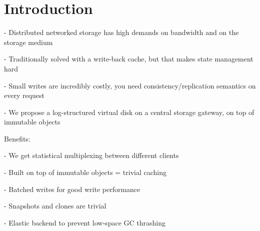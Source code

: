 \section{Introduction}

- Distributed networked storage has high demands on bandwidth and on the storage medium

- Traditionally solved with a write-back cache, but that makes state management hard

- Small writes are incredibly costly, you need consistency/replication semantics on every request

- We propose a log-structured virtual disk on a central storage gateway, on top
  of immutable objects

Benefits:

- We get statistical multiplexing between different clients

- Built on top of immutable objects = trivial caching

- Batched writes for good write performance

- Snapshots and clones are trivial

- Elastic backend to prevent low-space GC thrashing
